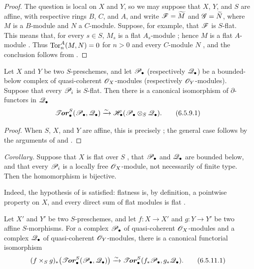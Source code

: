 \begin{proof}
The question is local on $X$ and $Y$, so we may suppose that
$X$, $Y$, and $S$ are affine, with respective rings $B$, $C$,
and $A$, and write $\mathscr{F}=\widetilde M$ and
$\mathscr{G}=\widetilde N$, where $M$ is a $B$-module and $N$ a
$C$-module.  Suppose, for example, that $\mathscr{F}$ is $S$-flat.
This means that, for every $s\in S$, $M_s$ is a flat
$A_s$-module ; hence $M$ is a flat
$A$-module .  Thus
$\operatorname{Tor}_n^A(M,N)=0$ for $n>0$ and every $C$-module $N$
, and the conclusion follows from
.
\end{proof}

\begin{corollary}[6.5.9]
\label{III.6.5.9}
Let $X$ and $Y$ be two $S$-preschemes, and let
$\mathscr{P}_\bullet$ \textup{(respectively $\mathscr{Q}_\bullet$)} be a
bounded-below complex of quasi-coherent $\mathscr{O}_X$-modules
\textup{(respectively} $\mathscr{O}_Y$-modules\textup{)}.  Suppose that every
$\mathscr{P}_i$ is $S$-flat.  Then there is a canonical isomorphism of
$\partial$-functors in $\mathscr{Q}_\bullet$
\[
  \boldsymbol{\mathscr{T}\!\mathit{or}}_\bullet^S(\mathscr{P}_\bullet,\mathscr{Q}_\bullet)
  \xrightarrow{\sim}
  \mathscr{H}_\bullet(\mathscr{P}_\bullet\otimes_S\mathscr{Q}_\bullet).
  \tag{6.5.9.1}\label{III.6.5.9.1}
\]
\end{corollary}

\begin{proof}
When $S$, $X$, and $Y$ are affine, this is precisely
; the general case follows by the arguments of
 and .
\end{proof}

\begin{env}[6.5.10]
\label{III.6.5.10}
\emph{Corollary.}
Suppose that $X$ is flat over $S$ , that
$\mathscr{P}_\bullet$ and $\mathscr{Q}_\bullet$ are bounded below, and that
every $\mathscr{P}_i$ is a locally free $\mathscr{O}_X$-module, not
necessarily of finite type.  Then the homomorphism
 is bijective.

Indeed, the hypothesis of  is satisfied:
flatness is, by definition, a pointwise property on $X$, and
every direct sum of flat modules is flat .
\end{env}

\begin{proposition}[6.5.11]
\label{III.6.5.11}
Let $X'$ and $Y'$ be two $S$-preschemes, and let
$f:X\to X'$ and $g:Y\to Y'$ be two affine $S$-morphisms.  For a
complex $\mathscr{P}_\bullet$ of quasi-coherent $\mathscr{O}_X$-modules and
a complex $\mathscr{Q}_\bullet$ of quasi-coherent $\mathscr{O}_Y$-modules,
there is a canonical functorial isomorphism
\[
  (f\times_Sg)_*
  \bigl(\boldsymbol{\mathscr{T}\!\mathit{or}}_\bullet^S(\mathscr{P}_\bullet,\mathscr{Q}_\bullet)\bigr)
  \xrightarrow{\sim}
  \boldsymbol{\mathscr{T}\!\mathit{or}}_\bullet^S(f_*\mathscr{P}_\bullet,g_*\mathscr{Q}_\bullet).
  \tag{6.5.11.1}\label{III.6.5.11.1}
\]
\end{proposition}

